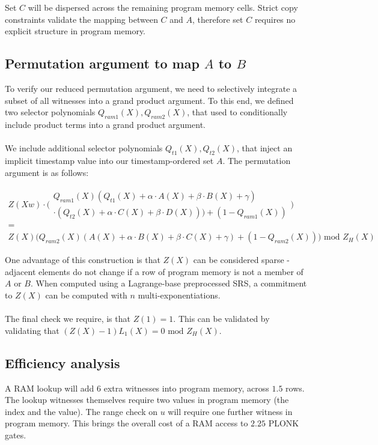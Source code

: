 \documentclass[11pt]{article} %
\begin{document}
Set $C$ will be dispersed across the remaining program memory cells. Strict copy constraints validate the mapping between $C$ and $A$, therefore set $C$ requires no explicit structure in program memory.

\subsection{Permutation argument to map $A$ to $B$}

To verify our reduced permutation argument, we need to selectively integrate a subset of all witnesses into a grand product argument. To this end, we defined two selector polynomials $Q_{ram1}(X), Q_{ram2}(X)$, that used to conditionally include product terms into a grand product argument.
\\
\\
We include additional selector polynomials $Q_{t1}(X), Q_{t2}(X)$, that inject an implicit timestamp value into our timestamp-ordered set $A$. The permutation argument is as follows:

$$
\begin{array}{c}
Z(Xw) \cdot \bigg(\begin{array}{c} Q_{ram1}(X)(Q_{t1}(X) + \alpha \cdot A(X) + \beta \cdot B(X) + \gamma)
\\
\cdot (Q_{t2}(X) + \alpha \cdot C(X) + \beta \cdot D(X))) + (1 - Q_{ram1}(X)) \end{array}\bigg)
\\ = \\
Z(X)\bigg(Q_{ram2}(X)(A(X) + \alpha \cdot B(X) + \beta \cdot C(X) + \gamma) + (1 - Q_{ram2}(X))\bigg) \text{ mod } Z_H(X)
\end{array}
$$

One advantage of this construction is that $Z(X)$ can be considered sparse - adjacent elements do not change if a row of program memory is not a member of $A$ or $B$. When computed using a Lagrange-base preprocessed SRS, a commitment to $Z(X)$ can be computed with $n$ multi-exponentiations.
\\
\\
The final check we require, is that $Z(1) = 1$. This can be validated by validating that $(Z(X) - 1) L_1(X) = 0 \text{ mod } Z_H(X)$.

\subsection{Efficiency analysis}

A RAM lookup will add $6$ extra witnesses into program memory, across $1.5$ rows. The lookup witnesses themselves require two values in program memory (the index and the value). The range check on $u$ will require one further witness in program memory. This brings the overall cost of a RAM access to $2.25$ PLONK gates.
\end{document}
